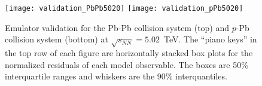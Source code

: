 \documentclass[aps,prc,reprint,amsmath,nofootinbib]{revtex4-1}
\newcommand{\sqrts}{\sqrt{s_{NN}}}
\newenvironment{fullpage}{\onecolumngrid}{\clearpage\twocolumngrid}
\begin{document}
\begin{fullpage}
\begin{figure}
  \texttt{[image: validation\_PbPb5020]}
  \texttt{[image: validation\_pPb5020]}
  \caption{\label{fig:val_pbpb} Emulator validation for the Pb-Pb collision system (top) and $p$-Pb collision system (bottom) at $\sqrts=5.02$~TeV. The ``piano keys'' in the top row of each figure are horizontally stacked box plots for the normalized residuals of each model observable. The boxes are 50\% interquartile ranges and whiskers are the 90\% interquantiles.}
\end{figure}
\end{fullpage}
\end{document}
